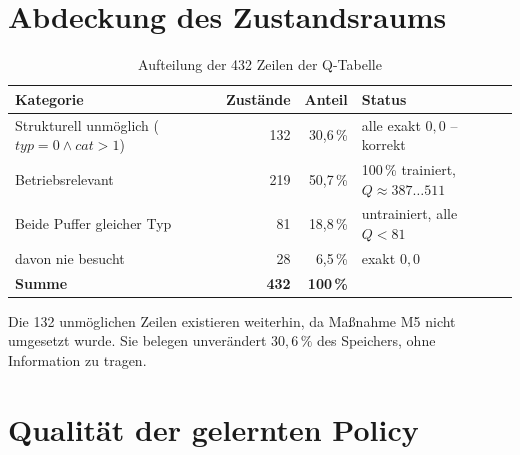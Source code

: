 \documentclass[11pt,a4paper]{article}
\begin{document}
\begin{center}
\end{center}

\section{Abdeckung des Zustandsraums}

\begin{table}[htbp]
\centering
\caption{Aufteilung der 432 Zeilen der Q-Tabelle}
\label{tab:abdeckung}
\begin{tabularx}{\textwidth}{@{}Lrrl@{}}
\toprule
\textbf{Kategorie} & \textbf{Zustände} & \textbf{Anteil} & \textbf{Status} \\
\midrule
Strukturell unmöglich ($typ=0 \wedge cat>1$) & 132 & 30,6\,\% & alle exakt $0{,}0$ -- korrekt \\
Betriebsrelevant                             & 219 & 50,7\,\% & 100\,\% trainiert, $Q \approx 387\ldots511$ \\
Beide Puffer gleicher Typ                    &  81 & 18,8\,\% & untrainiert, alle $Q < 81$ \\
\quad davon nie besucht                      &  28 &  6,5\,\% & exakt $0{,}0$ \\
\midrule
\textbf{Summe}                               & \textbf{432} & \textbf{100\,\%} & \\
\bottomrule
\end{tabularx}
\end{table}

\noindent
Die 132 unmöglichen Zeilen existieren weiterhin, da Maßnahme M5 nicht
umgesetzt wurde. Sie belegen unverändert $30{,}6\,\%$ des Speichers, ohne
Information zu tragen.

\section{Qualität der gelernten Policy}
\end{document}
